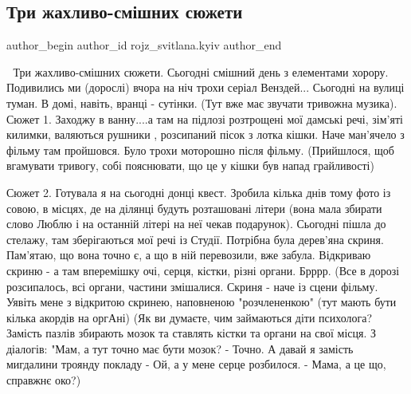  
 
 
 
 
 
\subsection{Три жахливо-смішних сюжети}
\label{sec:10_12_2022.fb.rojz_svitlana.kyiv.1.sjuzhety}
 
\ifcmt
 author_begin
   author_id rojz_svitlana.kyiv
 author_end
\fi

🙂 Три жахливо-смішних сюжети. Сьогодні смішний день з елементами хорору.
Подивились ми (дорослі) вчора на ніч трохи серіал Венздей... Сьогодні на вулиці
туман. В домі, навіть, вранці - сутінки. (Тут вже має звучати тривожна музика).
Сюжет 1. Заходжу в ванну....а там на підлозі розтрощені мої дамські речі,
зім'яті килимки, валяються рушники , розсипаний пісок з лотка кішки. Наче
ман'ячело з фільму там пройшовся. Було трохи моторошно після фільму.
(Прийшлося, щоб вгамувати тривогу, собі пояснювати, що це у кішки був напад
грайливості)


Сюжет 2. Готувала я на сьогодні донці квест. Зробила кілька днів тому фото із
совою, в місцях, де на ділянці будуть розташовані літери (вона мала збирати
слово Люблю і на останній літері на неї чекав подарунок). Сьогодні пішла до
стелажу, там зберігаються мої речі із Студії. Потрібна була дерев'яна  скриня.
Пам'ятаю, що вона точно є, а що в ній перевозили, вже забула. Відкриваю скриню
- а там вперемішку очі, серця, кістки, різні органи.  Брррр. (Все в дорозі
розсипалось, всі органи, частини змішалися. Скриня - наче із сцени фільму.
Уявіть мене з відкритою скринею, наповненою "розчлененкою" (тут мають бути
кілька акордів на оргАні)  (Як ви думаєте, чим займаються діти психолога?
Замість пазлів збирають мозок та ставлять кістки та органи на свої місця. З
діалогів: "Мам, а тут точно має бути мозок? - Точно. А давай я замість
мигдалини троянду покладу - Ой, а у мене серце розбилося. - Мама, а це що,
справжнє око?)

